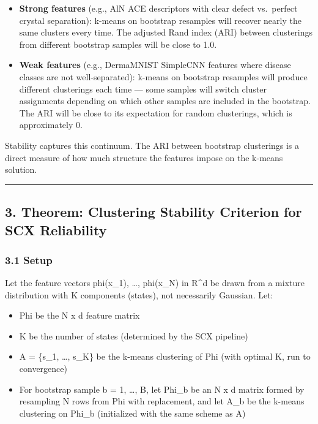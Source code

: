 \documentclass[
  12pt,
]{ctexart}
\providecommand{\tightlist}{%
  \setlength{\itemsep}{0pt}\setlength{\parskip}{0pt}}
\begin{document}
\begin{itemize}
\item
  \textbf{Strong features} (e.g., AlN ACE descriptors with clear defect
  vs.~perfect crystal separation): k-means on bootstrap resamples will
  recover nearly the same clusters every time. The adjusted Rand index
  (ARI) between clusterings from different bootstrap samples will be
  close to 1.0.
\item
  \textbf{Weak features} (e.g., DermaMNIST SimpleCNN features where
  disease classes are not well-separated): k-means on bootstrap
  resamples will produce different clusterings each time --- some
  samples will switch cluster assignments depending on which other
  samples are included in the bootstrap. The ARI will be close to its
  expectation for random clusterings, which is approximately 0.
\end{itemize}

Stability captures this continuum. The ARI between bootstrap clusterings
is a direct measure of how much structure the features impose on the
k-means solution.

\begin{center}\rule{0.5\linewidth}{0.5pt}\end{center}

\subsection{3. Theorem: Clustering Stability Criterion for SCX
Reliability}\label{theorem-clustering-stability-criterion-for-scx-reliability}

\subsubsection{3.1 Setup}\label{setup}

Let the feature vectors phi(x\_1), \ldots, phi(x\_N) in R\^{}d be drawn
from a mixture distribution with K components (states), not necessarily
Gaussian. Let:

\begin{itemize}
\tightlist
\item
  Phi be the N x d feature matrix
\item
  K be the number of states (determined by the SCX pipeline)
\item
  A = \{s\_1, \ldots, s\_K\} be the k-means clustering of Phi (with
  optimal K, run to convergence)
\item
  For bootstrap sample b = 1, \ldots, B, let Phi\_b be an N x d matrix
  formed by resampling N rows from Phi with replacement, and let A\_b be
  the k-means clustering on Phi\_b (initialized with the same scheme as
  A)
\end{itemize}
\end{document}
